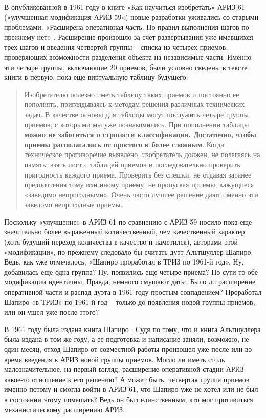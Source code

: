 \documentclass[11pt,a4paper]{article}
\begin{document}
В опубликованной в 1961 году в книге «Как научиться изобретать»
\cite{Altshuller1961} АРИЗ-61 («улучшенная модификация АРИЗ-59«) новые
разработки уживались со старыми проблемами. «Расширена оперативная часть. Но
правил выполнения шагов по-прежнему нет» \cite{Altshuller1986a}. Расширение
произошло за счет развертывания уже имевшихся трех шагов и введения четвертой
группы -- списка из четырех приемов, проверяющих возможности разделения
объекта на независимые части. Именно эти четыре группы, включающие 20 приемов,
были условно сведены в тексте книги в первую, пока еще виртуальную таблицу
будущего: 
\begin{quote}
  Изобретателю полезно иметь таблицу таких приемов и постоянно ее пополнять,
  приглядываясь к методам решения различных технических задач. В качестве
  основы для таблицы могут послужить четыре группы приемов, с которыми мы уже
  познакомились. При пополнении таблицы \textbf{можно не заботиться о
    строгости классификации. Достаточно, чтобы приемы располагались от
    простого к более сложным}. Когда техническое противоречие выявлено,
  изобретатель должен, не полагаясь на память, взять лист с таблицей приемов и
  последовательно проверить пригодность каждого приема. Проверить без спешки,
  не отдавая заранее предпочтения тому или иному приему, не пропуская приемы,
  кажущиеся «заведомо непригодными». Очень часто лучшее решение дают именно
  эти заведомо непригодные приемы.
\end{quote}

Поскольку «улучшение» в АРИЗ-61 по сравнению с АРИЗ-59 носило пока еще
значительно более выраженный количественный, чем качественный характер (хотя
будущий переход количества в качество и наметился), авторами этой
«модификации», по-прежнему следовало бы считать дуэт Альтшуллер-Шапиро. Ведь,
как уже отмечалось, «Шапиро проработал в ТРИЗ по 1961-й год». Ну, добавилась
еще одна группа? Ну, появились еще четыре приема? По сути-то обе модификации
идентичны. Правда, немного смущают даты. Было ли расширение оперативной части
и распад дуэта в 1961 году простым совпадением? Проработал Шапиро «в ТРИЗ» по
1961-й год -- только до появления новой группы приемов, или он ушел уже после
этого?

В 1961 году была издана книга Шапиро \cite{Bachmatov1961}. Судя по тому, что и
книга Альтшуллера была издана в том же году, а ее подготовка и написание
заняли, возможно, не один месяц, отход Шапиро от совместной работы произошел
уже после или во время введения в АРИЗ новой группы приемов. Могло ли иметь
столь малозначительное, на первый взгляд, расширение оперативной стадии АРИЗ
какое-то отношение к его решению? А может быть, четвертая группа приемов
именно потому и смогла войти в АРИЗ-61, что Шапиро уже не хотел или не был в
состоянии этому помешать? Ведь он был единственным, кто мог противиться
механистическому расширению АРИЗ.
\end{document}
